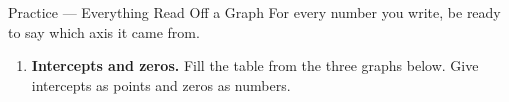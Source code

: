 \documentclass[10pt]{article}
\begin{document}

\vspace{0.15in}

\boxguard[24]
\begin{notesbox}{Practice --- Everything Read Off a Graph}
\small
For every number you write, be ready to say which axis it came from.

\begin{enumerate}[leftmargin=1.6em, itemsep=6pt, topsep=4pt]

\item \textbf{Intercepts and zeros.} Fill the table from the three graphs below. Give intercepts as
points and zeros as numbers.


\end{enumerate}
\end{notesbox}
\end{document}
